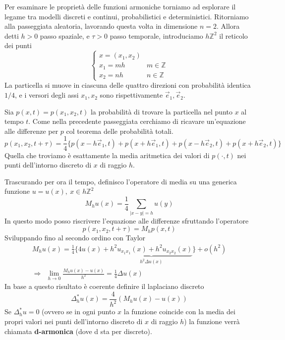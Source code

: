 \documentclass[10pt,a4paper,twoside,openright]{book}
\begin{document}
Per esaminare le proprietà delle funzioni armoniche torniamo ad esplorare il legame tra modelli discreti e continui, probabilistici e deterministici. Ritorniamo alla passeggiata aleatoria, lavorando questa volta in dimensione $\displaystyle n=2$. Allora detti $\displaystyle h >0$ passo spaziale, e $\displaystyle \tau  >0$ passo temporale, introduciamo $\displaystyle h\mathbb{Z}^{2}$ il reticolo dei punti 
\begin{equation*}
	\begin{cases}
		x=(x_{1},x_{2}) &                 \\
		x_{1} =mh         & m\in \mathbb{Z} \\
		x_{2} =nh         & n\in \mathbb{Z} 
	\end{cases}
\end{equation*}
La particella si muove in ciascuna delle quattro direzioni con probabilità identica $\displaystyle 1/4$, e i versori degli assi $\displaystyle x_{1},x_{2}$ sono rispettivamente $\displaystyle \vec{e}_{1},\vec{e}_{2}$.

Sia $\displaystyle p(x,t) =p(x_{1},x_{2},t)$ la probabilità di trovare la particella nel punto $\displaystyle x$ al tempo $\displaystyle t$. Come nella precedente passeggiata cerchiamo di ricavare un'equazione alle differenze per $\displaystyle p$ col teorema delle probabilità totali.
\begin{equation*}
	p( x_{1},x_{2},t+\tau) =\frac{1}{4}\{p( x-h\vec{e}_{1},t) +p( x+h\vec{e}_{1},t) +p( x-h\vec{e}_{2},t) +p( x+h\vec{e}_{2},t)\}
\end{equation*}
Quella che troviamo è esattamente la media aritmetica dei valori di $\displaystyle p(\cdotp,t)$ nei punti dell'intorno discreto di $\displaystyle x$ di raggio $\displaystyle h$. 

Trascurando per ora il tempo, definisco l'operatore di media su una generica funzione $\displaystyle u=u(x),\ x\in h\mathbb{Z}^{2}$
\begin{equation*}
	M_{h} u(x) =\frac{1}{4}\sum _{| x-y| =h} u(y)
\end{equation*}
In questo modo posso riscrivere l'equazione alle differenze sfruttando l'operatore
\begin{equation*}
	p( x_{1},x_{2},t+\tau) =M_{h} p(x,t)
\end{equation*}
Sviluppando fino al secondo ordino con Taylor
\begin{gather*}
	M_{h} u(x) =\frac{1}{4}\bigg\{ 4u(x) +\underbrace{h^{2} u_{x_{1} x_{1}}(x) +h^{2} u_{x_{2} x_{2}}(x)}_{h^{2} \Delta u(x)}\bigg\} +o\left(h^{2}\right)\\
	\Rightarrow \ \ \lim _{h\rightarrow 0}\frac{M_{h} u(x) -u(x)}{h^{2}} =\frac{1}{4} \Delta u(x)
\end{gather*}
In base a questo risultato è coerente definire il laplaciano discreto
\begin{equation}
	\Delta ^{*}_{h} u(x) =\frac{4}{h^{2}}(M_{h} u(x) -u(x))
\end{equation}
Se $\displaystyle \Delta ^{*}_{h} u=0$ (ovvero se in ogni punto $\displaystyle x$ la funzione coincide con la media dei propri valori nei punti dell'intorno discreto di $\displaystyle x$ di raggio $\displaystyle h$) la funzione verrà chiamata \textbf{d-armonica} (dove d sta per discreto).
\end{document}
